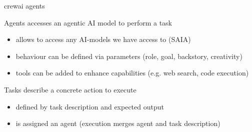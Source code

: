 \documentclass[t,
10pt,
]{beamer}
\numberwithin{equation}{section}
\begin{document}
	\begin{frame}[c]{crewai agents}
		\begin{block}{Agents\autocite{agentPy}}
			accesses an agentic AI model to perform a task
			\pause
			\begin{itemize}
				\item allows to access any AI-models we have access to (SAIA)
				\item behaviour can be defined via parameters (role, goal, backstory, creativity)
				\item tools can be added to enhance capabilities (e.g. web search, code execution)
			\end{itemize}
		\end{block}
		\pause
		\begin{block}{Tasks\autocite{taskPy}}
			describe a concrete action to execute
			\pause
			\begin{itemize}
				\item defined by task description and expected output
				\item is assigned an agent (execution merges agent and task description)
			\end{itemize}
		\end{block}
	\end{frame}
	
\end{document}
